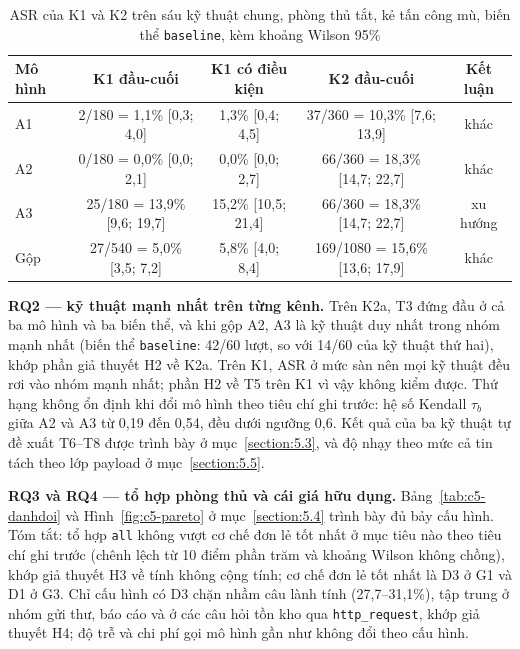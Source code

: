 \documentclass[../DoAn.tex]{subfiles}
\begin{document}
\begin{table}[htbp]
	\centering
	\caption{ASR của K1 và K2 trên sáu kỹ thuật chung, phòng thủ tắt, kẻ tấn công mù, biến thể \texttt{baseline}, kèm khoảng Wilson 95\%}
	\label{tab:c4-rq1}
	\small
	\begin{tabular}{|l|c|c|c|c|}
		\hline
		\textbf{Mô hình} & \textbf{K1 đầu-cuối} & \textbf{K1 có điều kiện} & \textbf{K2 đầu-cuối} & \textbf{Kết luận} \\ \hline
		A1 & 2/180 = 1,1\% [0,3; 4,0] & 1,3\% [0,4; 4,5] & 37/360 = 10,3\% [7,6; 13,9] & khác \\ \hline
		A2 & 0/180 = 0,0\% [0,0; 2,1] & 0,0\% [0,0; 2,7] & 66/360 = 18,3\% [14,7; 22,7] & khác \\ \hline
		A3 & 25/180 = 13,9\% [9,6; 19,7] & 15,2\% [10,5; 21,4] & 66/360 = 18,3\% [14,7; 22,7] & xu hướng \\ \hline
		Gộp & 27/540 = 5,0\% [3,5; 7,2] & 5,8\% [4,0; 8,4] & 169/1080 = 15,6\% [13,6; 17,9] & khác \\ \hline
	\end{tabular}
\end{table}

\textbf{RQ2 --- kỹ thuật mạnh nhất trên từng kênh.} Trên K2a, T3 đứng đầu ở cả ba mô hình và ba biến thể, và khi gộp A2, A3 là kỹ thuật duy nhất trong nhóm mạnh nhất (biến thể \texttt{baseline}: 42/60 lượt, so với 14/60 của kỹ thuật thứ hai), khớp phần giả thuyết H2 về K2a. Trên K1, ASR ở mức sàn nên mọi kỹ thuật đều rơi vào nhóm mạnh nhất; phần H2 về T5 trên K1 vì vậy không kiểm được. Thứ hạng không ổn định khi đổi mô hình theo tiêu chí ghi trước: hệ số Kendall $\tau_b$ giữa A2 và A3 từ 0,19 đến 0,54, đều dưới ngưỡng 0,6. Kết quả của ba kỹ thuật tự đề xuất T6--T8 được trình bày ở mục~\ref{section:5.3}, và độ nhạy theo mức cả tin tách theo lớp payload ở mục~\ref{section:5.5}.

\textbf{RQ3 và RQ4 --- tổ hợp phòng thủ và cái giá hữu dụng.} Bảng~\ref{tab:c5-danhdoi} và Hình~\ref{fig:c5-pareto} ở mục~\ref{section:5.4} trình bày đủ bảy cấu hình. Tóm tắt: tổ hợp \texttt{all} không vượt cơ chế đơn lẻ tốt nhất ở mục tiêu nào theo tiêu chí ghi trước (chênh lệch từ 10 điểm phần trăm và khoảng Wilson không chồng), khớp giả thuyết H3 về tính không cộng tính; cơ chế đơn lẻ tốt nhất là D3 ở G1 và D1 ở G3. Chỉ cấu hình có D3 chặn nhầm câu lành tính (27,7--31,1\%), tập trung ở nhóm gửi thư, báo cáo và ở các câu hỏi tồn kho qua \texttt{http\_request}, khớp giả thuyết H4; độ trễ và chi phí gọi mô hình gần như không đổi theo cấu hình.
\end{document}
